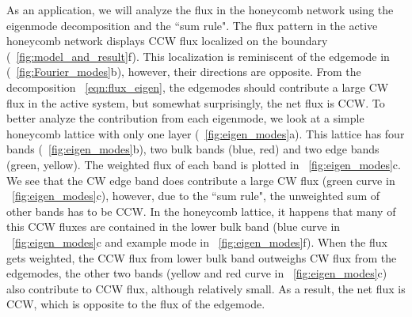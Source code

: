 \documentclass[
 preprint,
 preprintnumbers,
 amsmath,amssymb,
 aps,
 pre,
 longbibliography,
 10pt, twocolumn
]{revtex4-1}
\begin{document}
As an application, we will analyze the flux in the honeycomb network using the eigenmode decomposition and the ``sum rule".
The flux pattern in the active honeycomb network displays CCW flux localized on the boundary (\figurename~\ref{fig:model_and_result}f). This localization is reminiscent of the edgemode in \cite{Nash2015TopologicalMetamaterials} (\figurename~\ref{fig:Fourier_modes}b), however, their directions are opposite.
From the decomposition \eqnname~\eqref{eqn:flux_eigen}, the edgemodes should contribute a large CW flux in the active system, but somewhat surprisingly, the net flux is CCW.
To better analyze the contribution from each eigenmode, we look at a simple honeycomb lattice with only one layer (\figurename~\ref{fig:eigen_modes}a).
This lattice has four bands (\figurename~\ref{fig:eigen_modes}b), two bulk bands (blue, red) and two edge bands (green, yellow). The weighted flux of each band is plotted in \figurename~\ref{fig:eigen_modes}c. We see that the CW edge band does contribute a large CW flux (green curve in \figurename~\ref{fig:eigen_modes}c), however, due to the ``sum rule", the unweighted sum of other bands has to be CCW. In the honeycomb lattice, it happens that many of this CCW fluxes are contained in the lower bulk band (blue curve in \figurename~\ref{fig:eigen_modes}c and example mode in \figurename~\ref{fig:eigen_modes}f). When the flux gets weighted, the CCW flux from lower bulk band outweighs CW flux from the edgemodes, the other two bands (yellow and red curve in \figurename~\ref{fig:eigen_modes}c) also contribute to CCW flux, although relatively small. As a result, the net flux is CCW, which is opposite to the flux of the edgemode.
\end{document}
